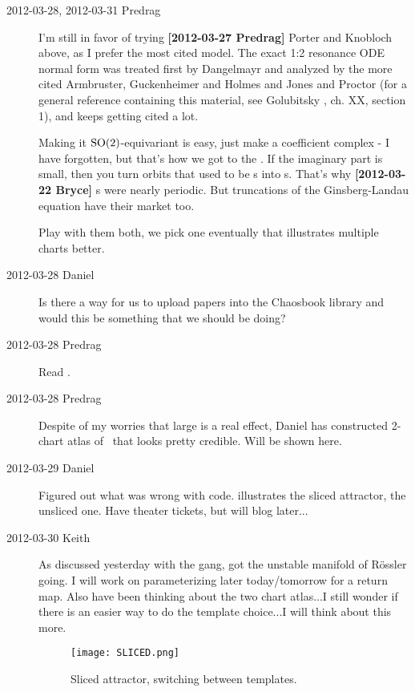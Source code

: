 \begin{description}
\item[2012-03-28, 2012-03-31 Predrag] I'm still in favor of trying {\bf
[2012-03-27 Predrag]} Porter and Knobloch above, as I prefer
the most cited model. The exact 1:2 resonance ODE normal form was
treated first by  Dangelmayr and analyzed by the more cited
Armbruster, Guckenheimer and Holmes and Jones and
Proctor (for a  general reference containing this material,
see Golubitsky \etal{}, ch. XX, section 1), and keeps getting
cited a lot.

Making it $\textrm{SO}(2)$-equivariant is easy, just make a coefficient complex
- I have forgotten, but that's how we got to the \cLe. If the imaginary
part is small, then you turn orbits that used to be \po s into \rpo s.
That's why {\bf [2012-03-22 Bryce]} \rpo s were nearly periodic. But
truncations of the Ginsberg-Landau equation have their market too.

Play with them both, we pick one eventually that illustrates multiple
charts better.

\item[2012-03-28 Daniel]
Is there a way for us to upload papers into the Chaosbook library and
would this be something that we should be doing?

\item[2012-03-28 Predrag] Read .

\item[2012-03-28 Predrag] Despite of my worries that
large {\phaseVel} is a real effect, Daniel has constructed 2-chart
atlas of \cLe\ that looks pretty credible. Will be shown here.

\item[2012-03-29 Daniel] Figured out what was wrong with code.
 illustrates the sliced attractor,
 the unsliced one. Have theater tickets, but will
blog later...

\item[2012-03-30 Keith] As discussed yesterday with the gang, got the
unstable manifold of R\"ossler going.  I will work on parameterizing later
today/tomorrow for a return map.  Also have been thinking about the two
chart atlas...I still wonder if there is an easier way to do the template
choice...I will think about this more.


\begin{figure}
\begin{center}
  \texttt{[image: SLICED.png]}
\end{center}
  \caption{
  Sliced attractor, switching between templates.}
\label{fig:sliced}
\end{figure}


\end{description}
